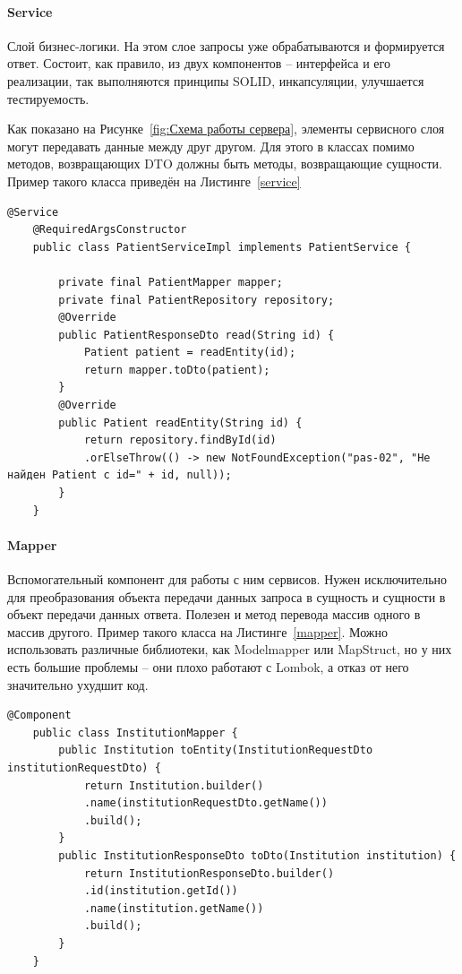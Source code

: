 \documentclass[a4paper,article]{article}
\begin{document}
    \paragraph{Service}\label{Реализация. Сервер. Service}
    
    Слой бизнес-логики. На этом слое запросы уже обрабатываются и формируется ответ. Состоит, как правило, из двух компонентов -- интерфейса и его реализации, так выполняются принципы SOLID, инкапсуляции, улучшается тестируемость.
    
    Как показано на Рисунке~\ref{fig:Схема работы сервера}, элементы сервисного слоя могут передавать данные между друг другом. Для этого в классах помимо методов, возвращающих DTO должны быть методы, возвращающие сущности. Пример такого класса приведён на Листинге~\ref{service}
   
   \begin{lstlisting}[label=service,caption=Пример класса слоя бизнес-логики]
    @Service
    @RequiredArgsConstructor
    public class PatientServiceImpl implements PatientService {
        
        private final PatientMapper mapper;
        private final PatientRepository repository;
        @Override
        public PatientResponseDto read(String id) {
            Patient patient = readEntity(id);
            return mapper.toDto(patient);
        }
        @Override
        public Patient readEntity(String id) {
            return repository.findById(id)
            .orElseThrow(() -> new NotFoundException("pas-02", "Не найден Patient с id=" + id, null));
        }
    }
    \end{lstlisting}
    
    \paragraph{Mapper}\label{Реализация. Сервер. Mapper}
    
    Вспомогательный компонент для работы с ним сервисов. Нужен исключительно для преобразования объекта передачи данных запроса в сущность и сущности в объект передачи данных ответа. Полезен и метод перевода массив одного в массив другого. Пример такого класса на Листинге~\ref{mapper}. Можно использовать различные библиотеки, как Modelmapper или MapStruct, но у них есть большие проблемы -- они плохо работают с Lombok, а отказ от него значительно ухудшит код.
    
   \begin{lstlisting}[label=mapper,caption=Пример класса-маппера]
    @Component
    public class InstitutionMapper {
        public Institution toEntity(InstitutionRequestDto institutionRequestDto) {
            return Institution.builder()
            .name(institutionRequestDto.getName())
            .build();
        }
        public InstitutionResponseDto toDto(Institution institution) {
            return InstitutionResponseDto.builder()
            .id(institution.getId())
            .name(institution.getName())
            .build();
        }
    }
    \end{lstlisting}
    
\end{document}
